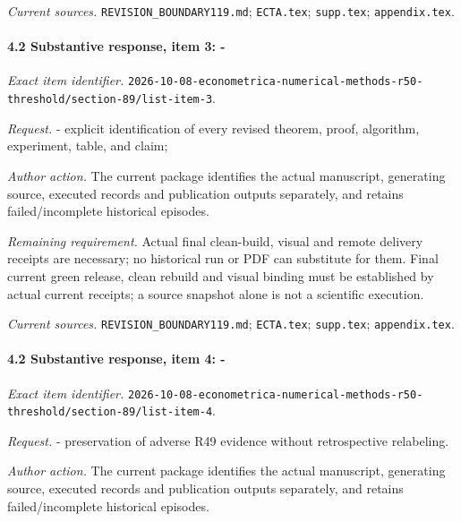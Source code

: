 \par\emph{Current sources.} \nolinkurl{REVISION_BOUNDARY119.md}; \nolinkurl{ECTA.tex}; \nolinkurl{supp.tex}; \nolinkurl{appendix.tex}.

\paragraph{4.2 Substantive response, item 3: -}

\emph{Exact item identifier.} \nolinkurl{2026-10-08-econometrica-numerical-methods-r50-threshold/section-89/list-item-3}.

\par\emph{Request.} - explicit identification of every revised theorem, proof, algorithm, experiment, table, and claim;

\par\emph{Author action.} The current package identifies the actual manuscript, generating source, executed records and publication outputs separately, and retains failed/\allowbreak{}incomplete historical episodes.

\par\emph{Remaining requirement.} Actual final clean-build, visual and remote delivery receipts are necessary; no historical run or PDF can substitute for them. Final current green release, clean rebuild and visual binding must be established by actual current receipts; a source snapshot alone is not a scientific execution.

\par\emph{Current sources.} \nolinkurl{REVISION_BOUNDARY119.md}; \nolinkurl{ECTA.tex}; \nolinkurl{supp.tex}; \nolinkurl{appendix.tex}.

\paragraph{4.2 Substantive response, item 4: -}

\emph{Exact item identifier.} \nolinkurl{2026-10-08-econometrica-numerical-methods-r50-threshold/section-89/list-item-4}.

\par\emph{Request.} - preservation of adverse R49 evidence without retrospective relabeling.

\par\emph{Author action.} The current package identifies the actual manuscript, generating source, executed records and publication outputs separately, and retains failed/\allowbreak{}incomplete historical episodes.

